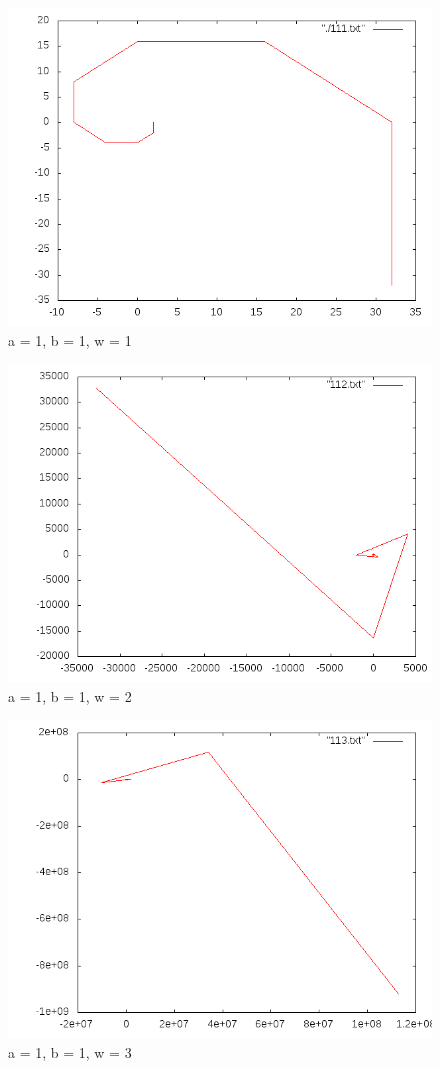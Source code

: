 \documentclass[12pt]{article}
\begin{document}
\begin{figure}[h!]
  \caption{a = 1, b = 1, w = 1}
  \centering
    \includegraphics[scale=0.3]{111.png}
\end{figure}
\begin{figure}[h!]
  \caption{a = 1, b = 1, w = 2}
  \centering
    \includegraphics[scale=0.3]{112.png}
\end{figure}
\begin{figure}[h!]
  \caption{a = 1, b = 1, w = 3}
  \centering
    \includegraphics[scale=0.3]{113.png}
\end{figure}
\end{document}
